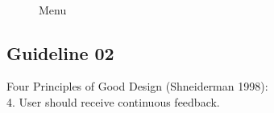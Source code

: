 \documentclass{article}
\begin{document}
\begin{figure}
  \centering

%
\qquad
    \qquad
     \\
    \caption{Menu}%
\end{figure}

\subsection{Guideline 02}
Four Principles of Good Design (Shneiderman 1998):\\
4. User should receive continuous feedback. \\
\end{document}
